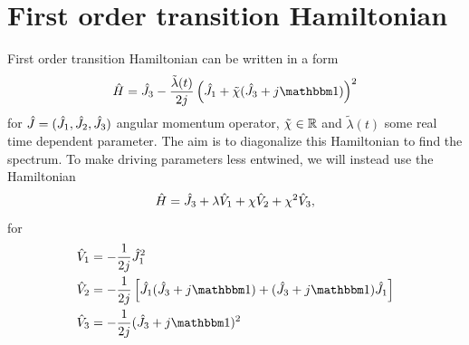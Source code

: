 \chapter{First order transition Hamiltonian}
First order transition Hamiltonian can be written in a form
\begin{equation}
    \HH=\J_3-\frac{\tilde\lambda(t)}{2j}\left(\J_1+\tilde\chi(\J_3+j\Id)\right)^2
    \label{eq:firstOrderTransitionHamiltonianOriginal}
\end{equation}
for $\hat{J}=(\hat{J}_1,\hat{J}_2,\hat{J}_3)$ angular momentum operator, $\tilde\chi\in\mathbb{R}$ and $\tilde\lambda(t)$ some real time dependent parameter. The aim is to diagonalize this Hamiltonian to find the spectrum. To make driving parameters less entwined, we will instead use the Hamiltonian
\begin{equation}
    \hat{H}=\hat{J}_3+\lambda\hat V_1 +\chi \hat V_2+\chi^2 \hat V_3,
    \label{eq:firstOrderTransitionHamiltonian}
\end{equation}
for
\begin{align}
    \hat V_1 &=-\frac{1}{2j}\J_1^2\\
    \hat V_2 &= -\frac{1}{2j}\left[\J_1(\J_3+j\Id)+(\J_3+j\Id)\J_1\right]\\
    \hat V_3 &= -\frac{1}{2j}(\J_3+j\Id)^2
\end{align}



